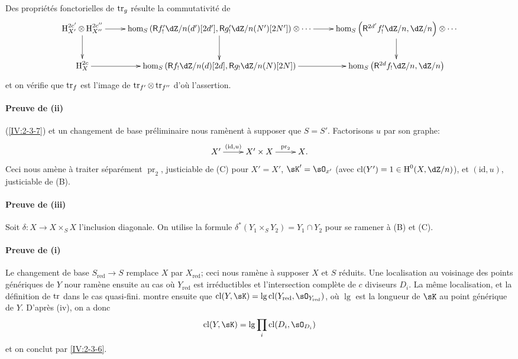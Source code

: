 Des propriétés fonctorielles de $\operatorname{tr}_g$ \cite[XVIII.2.12]{sga4} résulte 
la commutativité de 
\[\xymatrix{
  \h_{X'}^{2c'}\otimes \h_{X''}^{2 c''}\ar[r] \ar[d] 
    & \hom_S\left(\R f_!' \dZ/n(d')[2 d'],\R g_!'\dZ/n(N')[2 N']\right)\otimes \cdots \ar[r] \ar[d] 
    & \hom_S\left(\R^{2 d'} f_!' \dZ/n,\dZ/n\right) \otimes \cdots \ar[d] \\
  \h_X^{2 c} \ar[r] 
    & \hom_S\left(\R f_!\dZ/n(d)[2 d],\R g_!\dZ/n(N)[2 N]\right) \ar[r] 
    & \hom_S\left(\R ^{2 d}f_!\dZ/n,\dZ/n\right)
}\]
et on vérifie que $\operatorname{tr}_f$ est l'image de $\operatorname{tr}_{f'}\otimes \operatorname{tr}_{f''}$ d'où 
l'assertion. 

\paragraph{Preuve de (ii)}
(\ref{IV:2-3-7}) et un changement de base préliminaire nous ramènent à 
supposer que $S=S'$. Factorisons $u$ par son graphe:
\[\xymatrix{
  X' \ar[r]^-{(\text{id},u)} 
    & X'\times X \ar[r]^-{\operatorname{pr}_2} 
    & X \text{.}
}\]
Ceci nous amène à traiter séparément $\operatorname{pr}_2$, justiciable 
de (C) pour $X'=X'$, $\sK'=\sO_{x'}$ (avec $\cl(Y')=1\in \h^0(X,\dZ/n)$), et 
$(\text{id},u)$, justiciable de (B). 

\paragraph{Preuve de (iii)}
Soit $\delta:X\to X\times_S X$ l'inclusion diagonale. On utilise la formule 
$\delta^\ast(Y_1\times_S Y_2) = Y_1\cap Y_2$ pour se ramener à 
(B) et (C). 

\paragraph{Preuve de (i)}
Le changement de base $S_\text{red}\to S$ remplace $X$ par $X_\text{red}$; ceci 
nous ramène à supposer $X$ et $S$ réduits. Une localisation au voisinage 
des points génériques de $Y$ nour ramène ensuite au cas où 
$Y_\text{red}$ est irréductibles et l'intersection complète de $c$ 
diviseurs $D_i$. La même localisation, et la définition de $\operatorname{tr}$ dans le 
cas quasi-fini. montre ensuite que 
$\cl(Y,\sK)=\operatorname{lg}\cl(Y_\text{red},\sO_{Y_\text{red}})$, où 
$\operatorname{lg}$ est la longueur de $\sK$ au point générique de $Y$. 
D'après (iv), on a donc 
\[
  \cl(Y,\sK) = \operatorname{lg} \prod_i \cl(D_i,\sO_{D_i})
\]
et on conclut par \ref{IV:2-3-6}. 





